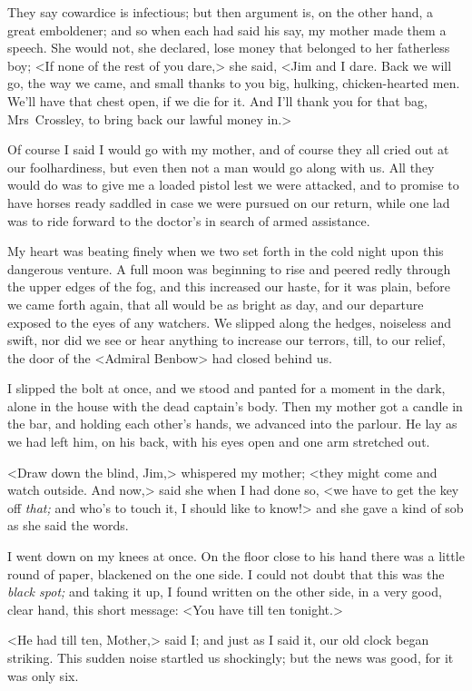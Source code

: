 They say cowardice is infectious; but then argument is, on the other hand, a great emboldener; and so when each had said his say, my mother made them a speech. She would not, she declared, lose money that belonged to her fatherless boy; <If none of the rest of you dare,> she said, <Jim and I dare. Back we will go, the way we came, and small thanks to you big, hulking, chicken-hearted men. We'll have that chest open, if we die for it. And I'll thank you for that bag, Mrs~Crossley, to bring back our lawful money in.>

Of course I said I would go with my mother, and of course they all cried out at our foolhardiness, but even then not a man would go along with us. All they would do was to give me a loaded pistol lest we were attacked, and to promise to have horses ready saddled in case we were pursued on our return, while one lad was to ride forward to the doctor's in search of armed assistance.

My heart was beating finely when we two set forth in the cold night upon this dangerous venture. A full moon was beginning to rise and peered redly through the upper edges of the fog, and this increased our haste, for it was plain, before we came forth again, that all would be as bright as day, and our departure exposed to the eyes of any watchers. We slipped along the hedges, noiseless and swift, nor did we see or hear anything to increase our terrors, till, to our relief, the door of the <Admiral Benbow> had closed behind us.

I slipped the bolt at once, and we stood and panted for a moment in the dark, alone in the house with the dead captain's body. Then my mother got a candle in the bar, and holding each other's hands, we advanced into the parlour. He lay as we had left him, on his back, with his eyes open and one arm stretched out.

<Draw down the blind, Jim,> whispered my mother; <they might come and watch outside. And now,> said she when I had done so, <we have to get the key off \textit{that;} and who's to touch it, I should like to know!> and she gave a kind of sob as she said the words.

I went down on my knees at once. On the floor close to his hand there was a little round of paper, blackened on the one side. I could not doubt that this was the \textit{black spot;} and taking it up, I found written on the other side, in a very good, clear hand, this short message: <You have till ten tonight.>

<He had till ten, Mother,> said I; and just as I said it, our old clock began striking. This sudden noise startled us shockingly; but the news was good, for it was only six.

